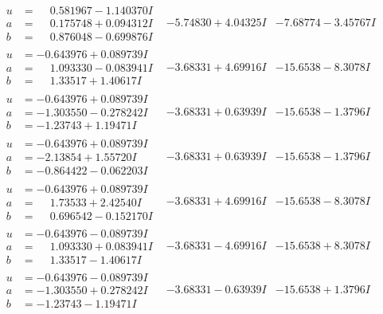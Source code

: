\documentclass[1p]{elsarticle_modified}
\theoremstyle{definition}
\begin{document}
$$\begin{array}{c|c|c}
\begin{aligned}
u &= \phantom{-}0.581967 - 1.140370 I \\
a &= \phantom{-}0.175748 + 0.094312 I \\
b &= \phantom{-}0.876048 - 0.699876 I\end{aligned}
 & -5.74830 + 4.04325 I & -7.68774 - 3.45767 I \\ \hline\begin{aligned}
u &= -0.643976 + 0.089739 I \\
a &= \phantom{-}1.093330 - 0.083941 I \\
b &= \phantom{-}1.33517 + 1.40617 I\end{aligned}
 & -3.68331 + 4.69916 I & -15.6538 - 8.3078 I \\ \hline\begin{aligned}
u &= -0.643976 + 0.089739 I \\
a &= -1.303550 - 0.278242 I \\
b &= -1.23743 + 1.19471 I\end{aligned}
 & -3.68331 + 0.63939 I & -15.6538 - 1.3796 I \\ \hline\begin{aligned}
u &= -0.643976 + 0.089739 I \\
a &= -2.13854 + 1.55720 I \\
b &= -0.864422 - 0.062203 I\end{aligned}
 & -3.68331 + 0.63939 I & -15.6538 - 1.3796 I \\ \hline\begin{aligned}
u &= -0.643976 + 0.089739 I \\
a &= \phantom{-}1.73533 + 2.42540 I \\
b &= \phantom{-}0.696542 - 0.152170 I\end{aligned}
 & -3.68331 + 4.69916 I & -15.6538 - 8.3078 I \\ \hline\begin{aligned}
u &= -0.643976 - 0.089739 I \\
a &= \phantom{-}1.093330 + 0.083941 I \\
b &= \phantom{-}1.33517 - 1.40617 I\end{aligned}
 & -3.68331 - 4.69916 I & -15.6538 + 8.3078 I \\ \hline\begin{aligned}
u &= -0.643976 - 0.089739 I \\
a &= -1.303550 + 0.278242 I \\
b &= -1.23743 - 1.19471 I\end{aligned}
 & -3.68331 - 0.63939 I & -15.6538 + 1.3796 I \\ \hline\begin{aligned}

\end{aligned}
\end{array}$$
\end{document}
